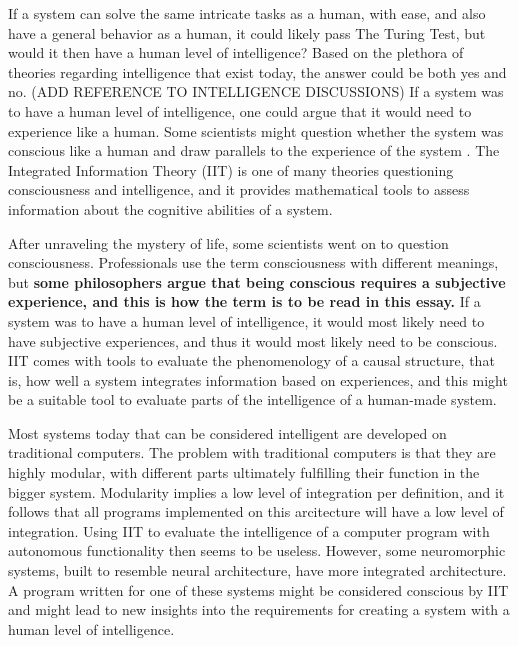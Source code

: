 If a system can solve the same intricate tasks as a human, with ease, and also have a general behavior as a human,
it could likely pass The Turing Test, but would it then have a human level of intelligence?
Based on the plethora of theories regarding intelligence that exist today, the answer could be both yes and no. (ADD REFERENCE TO INTELLIGENCE DISCUSSIONS)
If a system was to have a human level of intelligence, one could argue that it would need to experience like a human.
Some scientists might question whether the system was conscious like a human and draw parallels to the experience of the system \cite{tononi_integrated_2016}.
The Integrated Information Theory (IIT) is one of many theories questioning consciousness and intelligence, and it provides mathematical tools
to assess information about the cognitive abilities of a system.

After unraveling the mystery of life, some scientists went on to question consciousness.
Professionals use the term consciousness with different meanings, but \textbf{some philosophers argue that being conscious requires a subjective experience, and this is how the term is to be read in this essay.}
If a system was to have a human level of intelligence, it would most likely need to have subjective experiences, and thus it would most likely need to be conscious.
IIT comes with tools to evaluate the phenomenology of a causal structure, that is,
how well a system integrates information based on experiences, and this might be a suitable tool to evaluate parts of the intelligence of a human-made system.

Most systems today that can be considered intelligent are developed on traditional computers. The problem with traditional computers is that they are highly modular, with different parts ultimately fulfilling their function in the bigger system. Modularity implies a low level of integration per definition, and it follows that all programs implemented on this arcitecture will have a low level of integration.
Using IIT to evaluate the intelligence of a computer program with autonomous functionality then seems to be useless.
However, some neuromorphic systems, built to resemble neural architecture, have more integrated architecture.
A program written for one of these systems might be considered conscious by IIT and might lead to new insights into the requirements for creating a system with a human level of intelligence.

